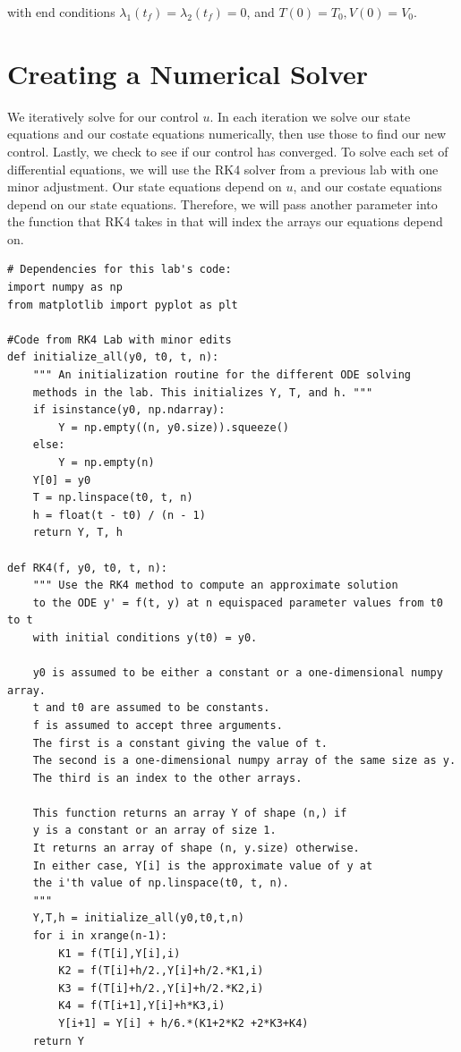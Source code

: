 with end conditions $\lambda_1(t_f)=\lambda_2(t_f)=0$, and $T(0)=T_0,V(0)=V_0$.

\section*{Creating a Numerical Solver}

We iteratively solve for our control $u$. In each iteration we solve our state equations and our costate equations numerically, then use those to find our new control. Lastly, we check to see if  our control has converged. To solve each set of differential equations, we will use the RK4 solver from a previous lab with one minor adjustment. Our state equations depend on $u$, and our costate equations depend on our state equations. Therefore, we will pass another parameter into the function that RK4 takes in that will index the arrays our equations depend on.

\begin{lstlisting}
# Dependencies for this lab's code:
import numpy as np
from matplotlib import pyplot as plt

#Code from RK4 Lab with minor edits				
def initialize_all(y0, t0, t, n):
    """ An initialization routine for the different ODE solving
    methods in the lab. This initializes Y, T, and h. """
    if isinstance(y0, np.ndarray):
        Y = np.empty((n, y0.size)).squeeze()
    else:
        Y = np.empty(n)
    Y[0] = y0
    T = np.linspace(t0, t, n)
    h = float(t - t0) / (n - 1)
    return Y, T, h

def RK4(f, y0, t0, t, n):
    """ Use the RK4 method to compute an approximate solution
    to the ODE y' = f(t, y) at n equispaced parameter values from t0 to t
    with initial conditions y(t0) = y0.
    
    y0 is assumed to be either a constant or a one-dimensional numpy array.
    t and t0 are assumed to be constants.
    f is assumed to accept three arguments.
    The first is a constant giving the value of t.
    The second is a one-dimensional numpy array of the same size as y.
    The third is an index to the other arrays.
    
    This function returns an array Y of shape (n,) if
    y is a constant or an array of size 1.
    It returns an array of shape (n, y.size) otherwise.
    In either case, Y[i] is the approximate value of y at
    the i'th value of np.linspace(t0, t, n).
    """
    Y,T,h = initialize_all(y0,t0,t,n)
    for i in xrange(n-1):
        K1 = f(T[i],Y[i],i)
        K2 = f(T[i]+h/2.,Y[i]+h/2.*K1,i)
        K3 = f(T[i]+h/2.,Y[i]+h/2.*K2,i)
        K4 = f(T[i+1],Y[i]+h*K3,i)
        Y[i+1] = Y[i] + h/6.*(K1+2*K2 +2*K3+K4)
    return Y
\end{lstlisting}

